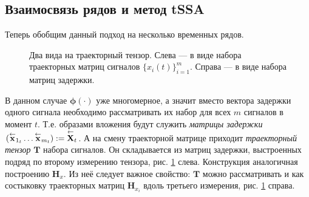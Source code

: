 		 \subsection*{Взаимосвязь рядов и метод tSSA}\label{sec:tssa_method}
		 
		 	Теперь обобщим данный подход на несколько временных рядов.
		 
		 	\begin{figure}[h]
		 		\centering
		 		
		 		\caption{Два вида на траекторный тензор. Слева --- в виде набора траекторных матриц сигналов $ \{x_i(t)\}_{i=1}^m $. Справа --- в виде набора матриц задержки.}\label{pic:traj_tensor}
		 	\end{figure}
	    
	    	В данном случае $ \boldsymbol{\phi}(\cdot) $ уже многомерное, а значит вместо вектора задержки одного сигнала необходимо рассматривать их набор для всех $ m $ сигналов в момент $ t $. Т.е. образами вложения будут служить \emph{матрицы задержки} $ ( \overset{\leftarrow}{\mathbf{x}}_{1_t} \ldots \overset{\leftarrow}{\mathbf{x}}_{m_t} ) := \overset{\leftarrow}{\mathbf{X}}_{t} $. А на смену траекторной матрице приходит \textit{траекторный тензор} $ \mathbf{T} $ набора сигналов. Он складывается из матриц задержки, выстроенных подряд по второму измерению тензора, рис. \ref{pic:traj_tensor} слева. Конструкция аналогичная построению $ \mathbf{H}_x $. Из неё следует важное свойство: $ \mathbf{T} $ можно рассматривать и как состыковку траекторных матриц $ \mathbf{H}_{x_i} $ вдоль третьего измерения, рис. \ref{pic:traj_tensor} справа.
	    	
